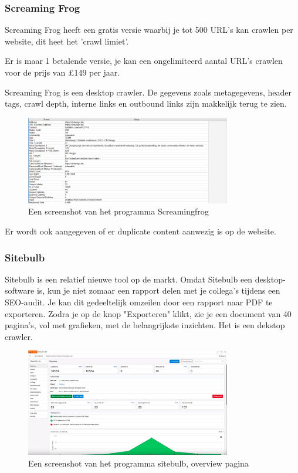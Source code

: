 \subsubsection{Screaming Frog}
\label{ch: Screaming Frog}

Screaming Frog heeft een gratis versie waarbij je tot 500 URL's kan crawlen per website, dit heet het 'crawl limiet'. 

Er is maar 1 betalende versie, je kan een ongelimiteerd aantal URL's crawlen voor de prijs van £149 per jaar. 

Screaming Frog is een desktop crawler. De gegevens zoals metagegevens, header tags, crawl depth, interne links en outbound links zijn makkelijk terug te zien. 

\begin{figure}[h!]
\centering
\includegraphics[width=0.8\textwidth]{img/screamingfrog.PNG}
\caption{Een screenshot van het programma Screamingfrog
\autocite{screamingfrog}}
\end{figure}

Er wordt ook aangegeven of er duplicate content aanwezig is op de website. 

\subsubsection{Sitebulb}
\label{ch: Sitebulb}

Sitebulb is een relatief nieuwe tool op de markt. Omdat Sitebulb een desktop-software is, kun je niet zomaar een rapport delen met je collega's tijdens een SEO-audit. Je kan dit gedeeltelijk omzeilen door een rapport naar PDF te exporteren. Zodra je op de knop "Exporteren" klikt, zie je een document van 40 pagina's, vol met grafieken, met de belangrijkste inzichten. Het is een dekstop crawler. 

\begin{figure}[h!]
\centering
\includegraphics[width=0.8\textwidth]{img/sitebulb.PNG}
\caption{Een screenshot van het programma sitebulb, overview pagina
\autocite{sitebulb}}
\end{figure}

